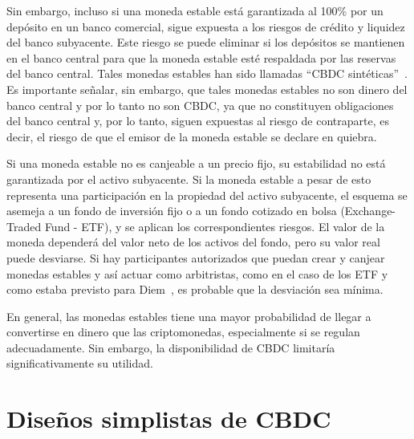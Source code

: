 \documentclass[a4paper,10pt]{article} %
\begin{document}
Sin embargo, incluso si una moneda estable está garantizada al 100\% por
un depósito en un banco comercial, sigue expuesta a los riesgos de
crédito y liquidez del banco subyacente. Este riesgo se puede eliminar
si los depósitos se mantienen en el banco central para que la moneda
estable esté respaldada por las reservas del banco central. Tales
monedas estables han sido llamadas ``CBDC sintéticas''~\cite{Adrian}.
Es importante señalar, sin embargo, que tales
monedas estables no son dinero del banco central y por lo tanto no son
CBDC, ya que no constituyen obligaciones del banco central y, por lo
tanto, siguen expuestas al riesgo de contraparte, es decir, el riesgo de
que el emisor de la moneda estable se declare en quiebra.

Si una moneda estable no es canjeable a un precio fijo, su estabilidad
no está garantizada por el activo subyacente. Si la moneda estable a
pesar de esto representa una participación en la propiedad del activo
subyacente, el esquema se asemeja a un fondo de inversión fijo o a un
fondo cotizado en bolsa (Exchange-Traded Fund - ETF), y se aplican los
correspondientes riesgos. El valor de la moneda dependerá del valor neto
de los activos del fondo, pero su valor real puede desviarse. Si hay
participantes autorizados que puedan crear y canjear monedas estables y
así actuar como arbitristas, como en el caso de los ETF y como estaba
previsto para Diem~\cite{Libra}, es probable que la
desviación sea mínima.

En general, las monedas estables tiene una mayor probabilidad de llegar
a convertirse en dinero que las criptomonedas, especialmente si se
regulan adecuadamente. Sin embargo, la disponibilidad de CBDC limitaría
significativamente su utilidad.

\section{Diseños simplistas de CBDC} \label{3.-diseuxf1os-simplistas-de-cbdc}
\end{document}
